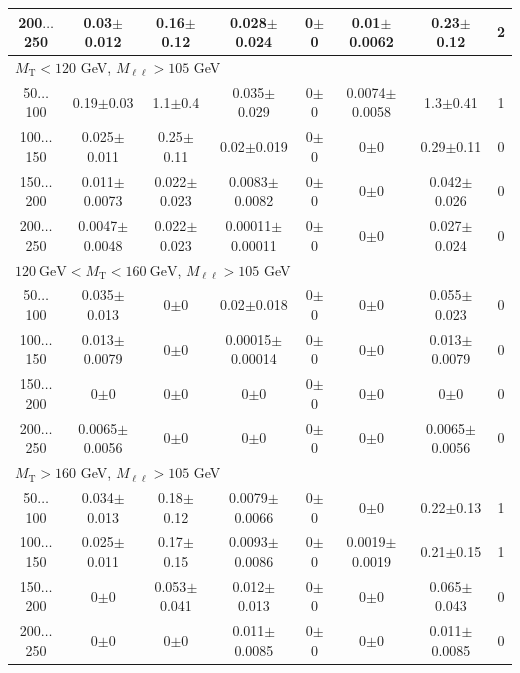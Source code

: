 \begin{landscape}
\begin{table}
\begin{center}
\begin{tabular}{| c | c c c c c c c | }
200$\dots$250&0.03$\pm$0.012&0.16$\pm$0.12&0.028$\pm$0.024&0$\pm$0&0.01$\pm$0.0062&0.23$\pm$0.12&2\\
\hline\hline
\multicolumn{7}{l}{$M_{\text{T}} < 120$ GeV, $M_{\ell\ell} > 105$ GeV}\\\hline\hline
50$\dots$100&0.19$\pm$0.03&1.1$\pm$0.4&0.035$\pm$0.029&0$\pm$0&0.0074$\pm$0.0058&1.3$\pm$0.41&1\\
100$\dots$150&0.025$\pm$0.011&0.25$\pm$0.11&0.02$\pm$0.019&0$\pm$0&0$\pm$0&0.29$\pm$0.11&0\\
150$\dots$200&0.011$\pm$0.0073&0.022$\pm$0.023&0.0083$\pm$0.0082&0$\pm$0&0$\pm$0&0.042$\pm$0.026&0\\
200$\dots$250&0.0047$\pm$0.0048&0.022$\pm$0.023&0.00011$\pm$0.00011&0$\pm$0&0$\pm$0&0.027$\pm$0.024&0\\
\hline\hline
\multicolumn{7}{l}{$120~\mathrm{GeV} < M_{\text{T}} < 160~\mathrm{GeV}$, $M_{\ell\ell} > 105$ GeV}\\\hline\hline
50$\dots$100&0.035$\pm$0.013&0$\pm$0&0.02$\pm$0.018&0$\pm$0&0$\pm$0&0.055$\pm$0.023&0\\
100$\dots$150&0.013$\pm$0.0079&0$\pm$0&0.00015$\pm$0.00014&0$\pm$0&0$\pm$0&0.013$\pm$0.0079&0\\
150$\dots$200&0$\pm$0&0$\pm$0&0$\pm$0&0$\pm$0&0$\pm$0&0$\pm$0&0\\
200$\dots$250&0.0065$\pm$0.0056&0$\pm$0&0$\pm$0&0$\pm$0&0$\pm$0&0.0065$\pm$0.0056&0\\
\hline\hline
\multicolumn{7}{l}{$M_{\text{T}} > 160$ GeV, $M_{\ell\ell} > 105$ GeV}\\\hline\hline
50$\dots$100&0.034$\pm$0.013&0.18$\pm$0.12&0.0079$\pm$0.0066&0$\pm$0&0$\pm$0&0.22$\pm$0.13&1\\
100$\dots$150&0.025$\pm$0.011&0.17$\pm$0.15&0.0093$\pm$0.0086&0$\pm$0&0.0019$\pm$0.0019&0.21$\pm$0.15&1\\
150$\dots$200&0$\pm$0&0.053$\pm$0.041&0.012$\pm$0.013&0$\pm$0&0$\pm$0&0.065$\pm$0.043&0\\
200$\dots$250&0$\pm$0&0$\pm$0&0.011$\pm$0.0085&0$\pm$0&0$\pm$0&0.011$\pm$0.0085&0\\
\hline\hline
\end{tabular}
\end{center}
\end{table}
\begin{table}
\begin{center}

\end{center}
\end{table}
\end{landscape}
